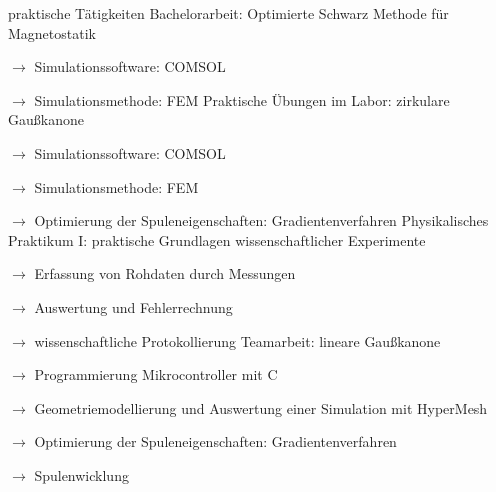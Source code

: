 \begin{rubric}{\textcolor{black!20!blue!100}{praktische Tätigkeiten}}%
		\entry*[\hphantom{00/0000 --- 00/}2016]
			Bachelorarbeit: Optimierte Schwarz Methode für Magnetostatik
			
			\setlength{\hangindent}{\widthof{$\rightarrow$ }}
			$\rightarrow$ Simulationssoftware: COMSOL
			
			$\rightarrow$ Simulationsmethode: FEM
		\entry*[\hfill 2015]
			Praktische Übungen im Labor: zirkulare Gaußkanone
			
			\setlength{\hangindent}{\widthof{$\rightarrow$ }}
			$\rightarrow$ Simulationssoftware: COMSOL
			
			$\rightarrow$ Simulationsmethode: FEM
			
			$\rightarrow$ Optimierung der Spuleneigenschaften: Gradientenverfahren
		\entry*[\hfill 2015]
			Physikalisches Praktikum I: praktische Grundlagen wissenschaftlicher Experimente
			
			\setlength{\hangindent}{\widthof{$\rightarrow$ }}
			$\rightarrow$ Erfassung von Rohdaten durch Messungen
			
			$\rightarrow$ Auswertung und Fehlerrechnung
			
			$\rightarrow$ wissenschaftliche Protokollierung
		\entry*[\hfill 2014]
			Teamarbeit: lineare Gaußkanone
			
			\setlength{\hangindent}{\widthof{$\rightarrow$ }}
			$\rightarrow$ Programmierung Mikrocontroller mit C
			
			$\rightarrow$ Geometriemodellierung und Auswertung einer Simulation mit HyperMesh
			
			$\rightarrow$ Optimierung der Spuleneigenschaften: Gradientenverfahren
			
			$\rightarrow$ Spulenwicklung
\end{rubric}